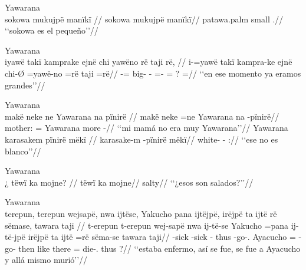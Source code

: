 \documentclass{memoir}
\begin{document}
\ex Yawarana \\
\label{perm-main-aff-npred-nsubj-maniki}    \begingl
    \glpreamble sokowa mukujpë manïkï //
    \gla sokowa mukujpë manïkï//
    \glb patawa.palm small .//
        \glft ‘‘sokowa es el pequeño’’//  
    \endgl 
\xe

\ex Yawarana \\
\label{perm-sub-aff-advpred-nsubj-cop}    \begingl
    \glpreamble iyawë takï kamprake ejnë chi yawëno rë taji rë, //
    \gla i-=yawë takï kampra-ke ejnë chi-Ø =yawë-no =rë taji =rë//
    \glb {}-=  big-  - =- = ? =//
        \glft ‘‘en ese momento ya eramos grandes’’//  
    \endgl 
\xe

\pex\label{perm-main-neg-npred-pinire-nsubj}    \a Yawarana\\
    \label{descmensgrme-67}        \begingl
        \glpreamble makë neke ne Yawarana na pïnirë //
        \gla makë neke =ne Yawarana na -pïnirë//
        \glb mother:  = Yawarana more -//
            \glft ‘‘mi mamá no era muy Yawarana’’//  
        \endgl 
    \a Yawarana\\
    \label{ctovarmafl-64}        \begingl
        \glpreamble karasakem pïnirë mëkï //
        \gla karasake-m -pïnirë mëkï//
        \glb white- - ://
            \glft ‘‘ese no es blanco’’//  
        \endgl 
\xe

\ex Yawarana \\
\label{perm-main-q-advpred-nsubj}    \begingl
    \glpreamble ¿ tëwï ka mojne? //
    \gla tëwï ka mojne//
    \glb {}  salty//
        \glft ‘‘¿esos son salados?’’//  
    \endgl 
\xe

\ex Yawarana \\
\label{temp-main-aff-npred-cop}    \begingl
    \glpreamble terepun, terepun wejsapë, nwa ijtëse, Yakucho pana ijtëjpë, irëjpë ta ijtë rë sëmase, tawara taji //
    \gla t-erepun t-erepun wej-sapë nwa ij-të-se Yakucho =pana ij-të-jpë irëjpë ta ijtë =rë sëma-se tawara taji//
    \glb {}-sick -sick - thus -go-. Ayacucho = -go- then like there = die-. thus ?//
        \glft ‘‘estaba enfermo, así se fue, se fue a Ayacucho y allá mismo murió’’//  
    \endgl 
\xe
\end{document}

